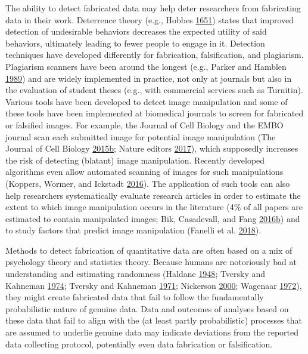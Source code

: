 \documentclass[a5paper]{book}
\begin{document}
The ability to detect fabricated data may help deter researchers from
fabricating data in their work. Deterrence theory (e.g., Hobbes
\protect\hyperlink{ref-leviathan}{1651}) states that improved detection
of undesirable behaviors decreases the expected utility of said
behaviors, ultimately leading to fewer people to engage in it. Detection
techniques have developed differently for fabrication, falsification,
and plagiarism. Plagiarism scanners have been around the longest (e.g.,
Parker and Hamblen
\protect\hyperlink{ref-doi:10.1109ux2f13.28038}{1989}) and are widely
implemented in practice, not only at journals but also in the evaluation
of student theses (e.g., with commercial services such as Turnitin).
Various tools have been developed to detect image manipulation and some
of these tools have been implemented at biomedical journals to screen
for fabricated or falsified images. For example, the Journal of Cell
Biology and the EMBO journal scan each submitted image for potential
image manipulation (The Journal of Cell Biology
\protect\hyperlink{ref-The_Journal_of_Cell_Biology2015-vh}{2015}\protect\hyperlink{ref-The_Journal_of_Cell_Biology2015-vh}{b};
Nature editors \protect\hyperlink{ref-doi:10.1038ux2f546575a}{2017}),
which supposedly increases the risk of detecting (blatant) image
manipulation. Recently developed algorithms even allow automated
scanning of images for such manipulations (Koppers, Wormer, and Ickstadt
\protect\hyperlink{ref-doi:10.1007ux2fs11948-016-9841-7}{2016}). The
application of such tools can also help researchers systematically
evaluate research articles in order to estimate the extent to which
image manipulation occurs in the literature (4\% of all papers are
estimated to contain manipulated images; Bik, Casadevall, and Fang
\protect\hyperlink{ref-doi:10.1128ux2fmBio.00809-16}{2016}\protect\hyperlink{ref-doi:10.1128ux2fmBio.00809-16}{b})
and to study factors that predict image manipulation (Fanelli et al.
\protect\hyperlink{ref-doi:10.1007ux2fs11948-018-0023-7}{2018}).

Methods to detect fabrication of quantitative data are often based on a
mix of psychology theory and statistics theory. Because humans are
notoriously bad at understanding and estimating randomness (Haldane
\protect\hyperlink{ref-Haldane1948-nm}{1948}; Tversky and Kahneman
\protect\hyperlink{ref-doi:10.1126ux2fscience.185.4157.1124}{1974};
Tversky and Kahneman
\protect\hyperlink{ref-doi:10.1037ux2fh0031322}{1971}; Nickerson
\protect\hyperlink{ref-doi:10.1037ux2f1082-989X.5.2.241}{2000}; Wagenaar
\protect\hyperlink{ref-doi:10.1037ux2fh0032060}{1972}), they might
create fabricated data that fail to follow the fundamentally
probabilistic nature of genuine data. Data and outcomes of analyses
based on these data that fail to align with the (at least partly
probabilistic) processes that are assumed to underlie genuine data may
indicate deviations from the reported data collecting protocol,
potentially even data fabrication or falsification.
\end{document}
